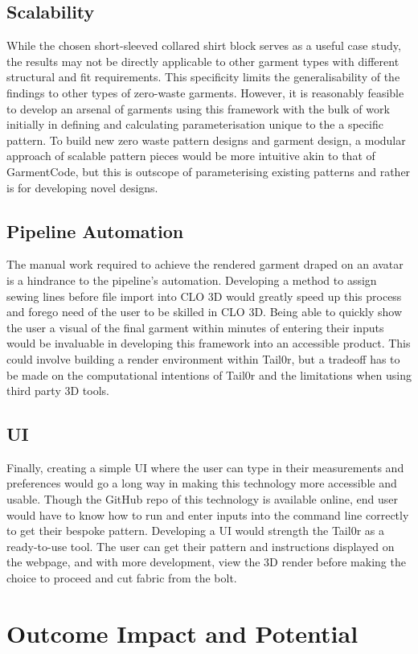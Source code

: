 \subsection{Scalability}
While the chosen short-sleeved collared shirt block serves as a useful case study, the results may not be directly applicable to other garment types with different structural and fit requirements. This specificity limits the generalisability of the findings to other types of zero-waste garments. However, it is reasonably feasible to develop an arsenal of garments using this framework with the bulk of work initially in defining and calculating parameterisation unique to the a specific pattern. To build new zero waste pattern designs and garment design, a modular approach of scalable pattern pieces would be more intuitive akin to that of GarmentCode, but this is outscope of parameterising existing patterns and rather is for developing novel designs.

\subsection{Pipeline Automation}
The manual work required to achieve the rendered garment draped on an avatar is a hindrance to the pipeline's automation. Developing a method to assign sewing lines before file import into CLO 3D would greatly speed up this process and forego need of the user to be skilled in CLO 3D. Being able to quickly show the user a visual of the final garment within minutes of entering their inputs would be invaluable in developing this framework into an accessible product. This could involve building a render environment within Tail0r, but a tradeoff has to be made on the computational intentions of Tail0r and the limitations when using third party 3D tools.

\subsection{UI}
Finally, creating a simple UI where the user can type in their measurements and preferences would go a long way in making this technology more accessible and usable. Though the GitHub repo of this technology is available online, end user would have to know how to run and enter inputs into the command line correctly to get their bespoke pattern. Developing a UI would strength the Tail0r as a ready-to-use tool. The user can get their pattern and instructions displayed on the webpage, and with more development, view the 3D render before making the choice to proceed and cut fabric from the bolt.

\section{Outcome Impact and Potential}
